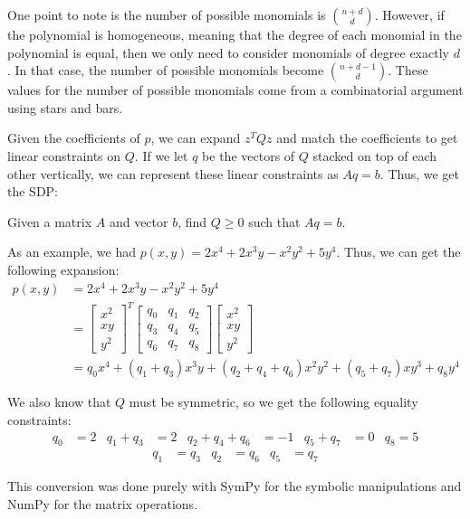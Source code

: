 \documentclass{article}
\begin{document}
One point to note is the number of possible monomials is $n+d \choose d$. However, if the polynomial is homogeneous, meaning that the degree of each monomial in the polynomial is equal, then we only need to consider monomials of degree exactly $d$ \cite{sos_convex}. In that case, the number of possible monomials become $n+d-1 \choose d$. These values for the number of possible monomials come from a combinatorial argument using stars and bars.

Given the coefficients of $p$, we can expand $z^TQz$ and match the coefficients to  get linear constraints on $Q$. If we let $q$ be the vectors of $Q$ stacked on top of each other vertically, we can represent these linear constraints as $Aq = b$. \cite{sosopt} Thus, we get the SDP:
\begin{center}
	Given a matrix $A$ and vector $b$, find $Q \ge 0$ such that $Aq=b$.
\end{center}

As an example, we had $p(x,y) = 2x^4 + 2x^3y - x^2y^2 + 5y^4$. Thus, we can get the following expansion:
\begin{align*}
p(x,y) &= 2x^4 + 2x^3y - x^2y^2 + 5y^4\\
&= \begin{bmatrix}
x^2 \\
xy \\
y^2
\end{bmatrix}^T
\begin{bmatrix}
q_0 & q_1 & q_2 \\
q_3 & q_4 & q_5 \\
q_6 & q_7 & q_8
\end{bmatrix}
\begin{bmatrix}
x^2 \\
xy \\
y^2
\end{bmatrix}\\
&= q_0x^4 + (q_1+q_3)x^3y + (q_2+q_4+q_6)x^2y^2 + (q_5+q_7)xy^3 + q_8y^4
\end{align*}

We also know that $Q$ must be symmetric, so we get the following equality constraints:
\begin{align*}
q_0 &= 2 & q_1+q_3 &= 2 & q_2+q_4+q_6 &= -1 & q_5+q_7 &= 0 & q_8 = 5
\end{align*}
\begin{align*}
q_1 &= q_3 & q_2 &= q_6 & q_5 &= q_7
\end{align*}

This conversion was done purely with SymPy for the symbolic manipulations and NumPy for the matrix operations.
\end{document}
